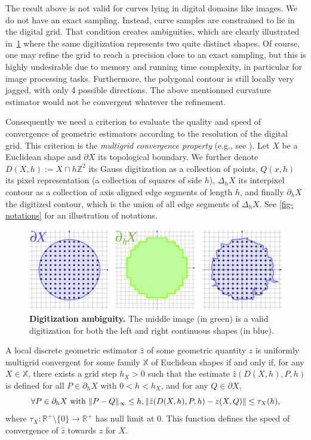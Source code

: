 \documentclass{siamart220329}
\DeclarePairedDelimiter\norm{\lVert}{\rVert}%
\begin{document}
The result above is not valid for curves lying in digital domains like images.
We do not have an exact sampling. Instead, curve samples are constrained to lie
in the digital grid. That condition creates ambiguities, which are clearly
illustrated in~\cref{fig:digitization-ambiguity} where the same digitization
represents two quite distinct shapes. Of course, one may refine the grid to
reach a precision close to an exact sampling, but this is highly undesirable due
to memory and running time complexity, in particular for image processing tasks.
Furthermore, the polygonal contour is still locally very jagged, with only 4
possible directions. The above mentionned curvature estimator would not be
convergent whatever the refinement.

Consequently we need a criterion to evaluate the quality and speed of
convergence of geometric estimators according to the resolution of the digital
grid. This criterion is the \emph{multigrid convergence property} (e.g., see
\cite{klette2004digital}). Let $X$ be a Euclidean shape and $\partial X$ its
topological boundary. We further denote $D(X,h):=X \cap h\mathbb{Z}^2$ its Gauss
digitization as a collection  of points, $Q(x,h)$ its pixel representation (a
collection  of squares of side $h$), $\Delta_h X$ its interpixel contour as a
collection  of axis aligned edge segments of length $h$, and finally
$\partial_hX$ the digitized contour, which is the union of all edge segments of
$\Delta_h X$. See \cref{fig-notations} for an illustration of notations.
%
%
\begin{figure}
\center
\includegraphics[scale=1]{figures/ambiguity-and-boundaries.png}
\caption{
    \textbf{Digitization ambiguity.} The middle image (in green) is a valid
    digitization for both the left and right continuous shapes (in blue).}
\label{fig:digitization-ambiguity}
\end{figure}
%
%
\begin{definition}
A local discrete geometric estimator $\hat{z}$ of some geometric quantity $z$
is uniformly multigrid convergent for some family $\mathbb{X}$ of Euclidean
shapes if and only if, for any $X \in \mathbb{X}$, there exists a grid step
$h_X>0$ such that the estimate $\hat{z}(D(X,h), P,h)$ is defined for all $P
\in \partial_hX$ with $ 0 < h < h_X$, and for any $Q \in \partial X$,
%
%
\begin{equation*}
  \forall P \in  \partial_hX \text{ with } \norm{ P - Q }_{\infty} \leq h,
  \norm{ \hat{z}(D(X,h),P,h) - z(X,Q)} \leq \tau_{X}(h),			
\end{equation*}
%
%
where $\tau_{X}:\mathbb{R}^{+}\setminus\{0\} \rightarrow
\mathbb{R}^{+}$ has null limit at $0$. This function defines the
speed of convergence of $\hat{z}$ towards $z$ for $X$.
\end{definition}
	
\end{document}
